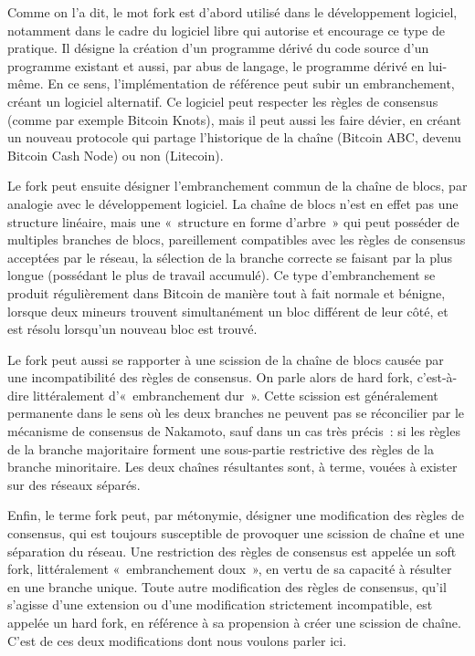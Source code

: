 Comme on l'a dit, le mot fork est d'abord utilisé dans le développement logiciel, notamment dans le cadre du logiciel libre qui autorise et encourage ce type de pratique. Il désigne la création d'un programme dérivé du code source d'un programme existant et aussi, par abus de langage, le programme dérivé en lui-même. En ce sens, l'implémentation de référence peut subir un embranchement, créant un logiciel alternatif. Ce logiciel peut respecter les règles de consensus (comme par exemple Bitcoin Knots), mais il peut aussi les faire dévier, en créant un nouveau protocole qui partage l'historique de la chaîne (Bitcoin ABC, devenu Bitcoin Cash Node) ou non (Litecoin).

Le fork peut ensuite désigner l'embranchement commun de la chaîne de blocs, par analogie avec le développement logiciel. La chaîne de blocs n'est en effet pas une structure linéaire, mais une «~structure en forme d'arbre~» qui peut posséder de multiples branches de blocs, pareillement compatibles avec les règles de consensus acceptées par le réseau, la sélection de la branche correcte se faisant par la plus longue (possédant le plus de travail accumulé). Ce type d'embranchement se produit régulièrement dans Bitcoin de manière tout à fait normale et bénigne, lorsque deux mineurs trouvent simultanément un bloc différent de leur côté, et est résolu lorsqu'un nouveau bloc est trouvé.

Le fork peut aussi se rapporter à une scission de la chaîne de blocs causée par une incompatibilité des règles de consensus. On parle alors de hard fork, c'est-à-dire littéralement d'«~embranchement dur~». Cette scission est généralement permanente dans le sens où les deux branches ne peuvent pas se réconcilier par le mécanisme de consensus de Nakamoto, sauf dans un cas très précis~: si les règles de la branche majoritaire forment une sous-partie restrictive des règles de la branche minoritaire. Les deux chaînes résultantes sont, à terme, vouées à exister sur des réseaux séparés.

Enfin, le terme fork peut, par métonymie, désigner une modification des règles de consensus, qui est toujours susceptible de provoquer une scission de chaîne et une séparation du réseau. Une restriction des règles de consensus est appelée un soft fork, littéralement «~embranchement doux~», en vertu de sa capacité à résulter en une branche unique. Toute autre modification des règles de consensus, qu'il s'agisse d'une extension ou d'une modification strictement incompatible, est appelée un hard fork, en référence à sa propension à créer une scission de chaîne. C'est de ces deux modifications dont nous voulons parler ici.

